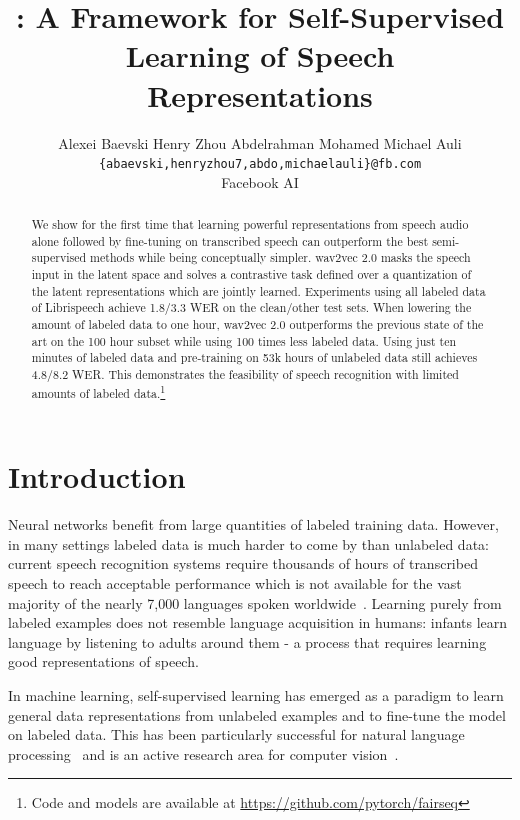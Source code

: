 \documentclass{article}
\title{\LARGE \wvpp{}: A Framework for Self-Supervised Learning of Speech Representations}
\author{%
  Alexei Baevski \And Henry Zhou \And Abdelrahman Mohamed \And Michael Auli \AND 
  {\tt \{abaevski,henryzhou7,abdo,michaelauli\}@fb.com} \\\AND
  Facebook AI
}
\begin{document}
\maketitle

\begin{abstract}
  We show for the first time that learning powerful representations from speech audio alone followed by fine-tuning on transcribed speech can outperform the best semi-supervised methods while being conceptually simpler.
  wav2vec 2.0 masks the speech input in the latent space and solves a contrastive task defined over a quantization of the latent representations which are jointly learned.
  Experiments using all labeled data of Librispeech achieve 1.8/3.3 WER on the clean/other test sets.
  When lowering the amount of labeled data to one hour, wav2vec 2.0 outperforms the previous state of the art on the 100 hour subset while using 100 times less labeled data.
  Using just ten minutes of labeled data and pre-training on 53k hours of unlabeled data still achieves 4.8/8.2 WER.
  This demonstrates the feasibility of speech recognition with limited amounts of labeled data.\footnote{Code and models are available at \url{https://github.com/pytorch/fairseq}}
\end{abstract}

\section{Introduction}

Neural networks benefit from large quantities of labeled training data. 
However, in many settings labeled data is much harder to come by than unlabeled data: 
current speech recognition systems require thousands of hours of transcribed speech to reach acceptable performance which is not available for the vast majority of the nearly 7,000 languages spoken worldwide~\citep{lewis2016ethnologue}. 
Learning purely from labeled examples does not resemble language acquisition in humans: infants learn language by listening to adults around them - a process that requires learning good representations of speech.

In machine learning, self-supervised learning has emerged as a paradigm to learn general data representations from unlabeled examples and to fine-tune the model on labeled data. 
This has been particularly successful for natural language processing~\citep{peters2018acl,radford2018unsup,devlin2018bert} and is an active research area for computer vision~\citep{henaff2019cpc,bachman2019learning,misra2019selfsupervised,he2019momentum,chen2020simple}.
\end{document}
